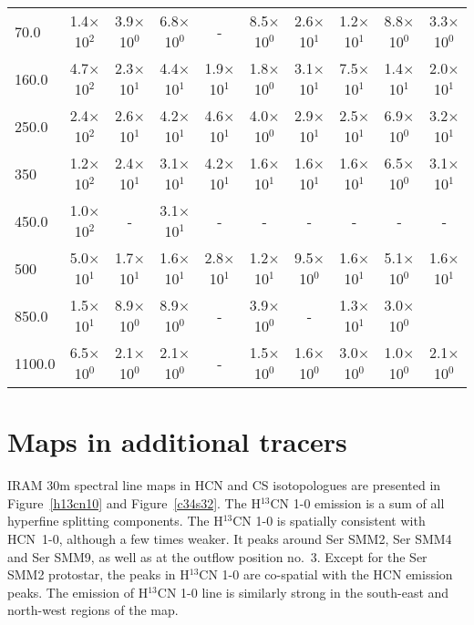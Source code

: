 \documentclass{aa}
\begin{document}
\begin{appendix}
\begin{table*}
\begin{tabular}{l c c c c c c c c c}
70.0 & 1.4$\times$10$^{2}$ & 3.9$\times$10$^{0}$ & 6.8$\times$10$^{0}$ & - & 8.5$\times$10$^{0}$ & 2.6$\times$10$^{1}$ & 1.2$\times$10$^{1}$ & 8.8$\times$10$^{0}$ & 3.3$\times$10$^{0}$\\
160.0 & 4.7$\times$10$^{2}$ & 2.3$\times$10$^{1}$ & 4.4$\times$10$^{1}$ & 1.9$\times$10$^{1}$ & 1.8$\times$10$^{0}$ & 3.1$\times$10$^{1}$ & 7.5$\times$10$^{1}$ & 1.4$\times$10$^{1}$ & 2.0$\times$10$^{1}$\\
250.0 &  2.4$\times$10$^{2}$ & 2.6$\times$10$^{1}$ & 4.2$\times$10$^{1}$ & 4.6$\times$10$^{1}$ & 4.0$\times$10$^{0}$ & 2.9$\times$10$^{1}$ & 2.5$\times$10$^{1}$ & 6.9$\times$10$^{0}$ & 3.2$\times$10$^{1}$\\
350 & 1.2$\times$10$^{2}$ & 2.4$\times$10$^{1}$ & 3.1$\times$10$^{1}$ & 4.2$\times$10$^{1}$ & 1.6$\times$10$^{1}$ & 1.6$\times$10$^{1}$ & 1.6$\times$10$^{1}$ & 6.5$\times$10$^{0}$ & 3.1$\times$10$^{1}$\\
450.0 & 1.0$\times$10$^{2}$ &-  & 3.1$\times$10$^{1}$ &- &- &- &- &- &-\\
500 & 5.0$\times$10$^{1}$ & 1.7$\times$10$^{1}$ & 1.6$\times$10$^{1}$ & 2.8$\times$10$^{1}$ & 1.2$\times$10$^{1}$ & 9.5$\times$10$^{0}$ & 1.6$\times$10$^{1}$ & 5.1$\times$10$^{0}$ & 1.6$\times$10$^{1}$\\
850.0 & 1.5$\times$10$^{1}$ & 8.9$\times$10$^{0}$ & 8.9$\times$10$^{0}$ & - & 3.9$\times$10$^{0}$ & - & 1.3$\times$10$^{1}$ & 3.0$\times$10$^{0}$ &\\
1100.0 & 6.5$\times$10$^{0}$ & 2.1$\times$10$^{0}$ & 2.1$\times$10$^{0}$ & - & 1.5$\times$10$^{0}$ & 1.6$\times$10$^{0}$ & 3.0$\times$10$^{0}$ & 1.0$\times$10$^{0}$ & 2.1$\times$10$^{0}$\\
\hline \end{tabular} 
\end{table*}

\section{Maps in additional tracers}
\label{app:maps}

IRAM 30m spectral line maps in HCN and CS isotopologues are presented in Figure~\ref{h13cn10} and Figure~\ref{c34s32}. The H$^{13}$CN 1-0 emission is a sum of all hyperfine splitting components. The H$^{13}$CN 1-0 is spatially consistent with \mbox{HCN 1-0}, although a few times weaker. It peaks around Ser SMM2, Ser SMM4 and Ser SMM9, as well as at the outflow position no.~3. Except for the Ser SMM2 protostar, the peaks in H$^{13}$CN 1-0 are co-spatial with the HCN emission peaks. The emission of H$^{13}$CN 1-0 line is similarly strong in the south-east and north-west regions of the map.


\end{appendix}
\end{document}
